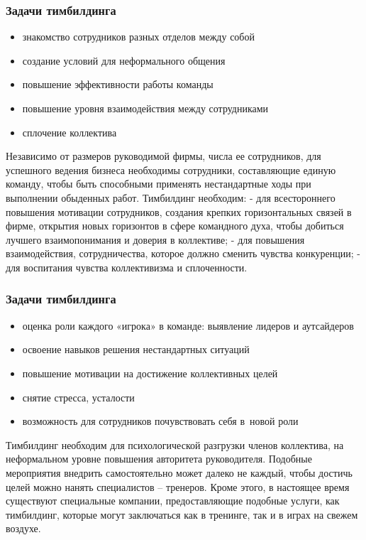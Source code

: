 \documentclass{../industrial-development}
\begin{document}
\begin{frame} \frametitle{Задачи тимбилдинга}
\begin{itemize}
\item знакомство сотрудников разных отделов между собой
\item создание условий для неформального общения
\item повышение эффективности работы команды
\item повышение уровня взаимодействия между сотрудниками
\item сплочение коллектива

\end{itemize}
\end{frame}
\lecturenotes Независимо от размеров руководимой фирмы, числа ее сотрудников, для успешного ведения бизнеса необходимы сотрудники, составляющие единую команду, чтобы быть способными применять нестандартные ходы при выполнении обыденных работ. Тимбилдинг необходим:
- для всестороннего повышения мотивации сотрудников, создания крепких горизонтальных связей в фирме, открытия новых горизонтов в сфере командного духа, чтобы добиться лучшего взаимопонимания и доверия в коллективе;
- для повышения взаимодействия, сотрудничества, которое должно сменить чувства конкуренции;
- для воспитания чувства коллективизма и сплоченности.


\begin{frame} \frametitle{Задачи тимбилдинга}
\begin{itemize}

\item оценка роли каждого «игрока» в команде: выявление лидеров и аутсайдеров
\item освоение навыков решения нестандартных ситуаций
\item повышение мотивации на достижение коллективных целей
\item снятие стресса, усталости
\item возможность для сотрудников почувствовать себя в~новой роли
\end{itemize}
\end{frame}
\lecturenotes Тимбилдинг необходим для психологической разгрузки членов коллектива, на неформальном уровне повышения авторитета руководителя. Подобные мероприятия внедрить самостоятельно может далеко не каждый, чтобы достичь целей можно нанять специалистов – тренеров. Кроме этого, в настоящее время существуют специальные компании, предоставляющие подобные услуги, как тимбилдинг, которые могут заключаться как в тренинге, так и в играх на свежем воздухе.
\end{document}
